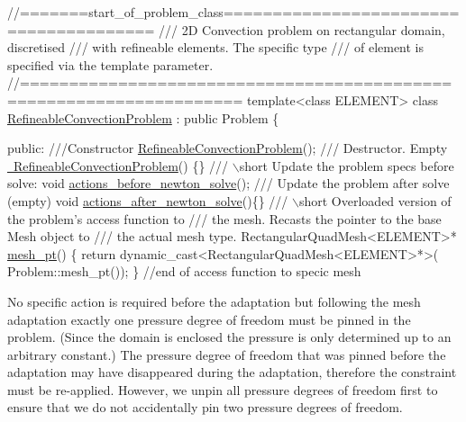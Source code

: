  
\begin{DoxyCodeInclude}
\textcolor{comment}{//=======start\_of\_problem\_class=======================================}
\textcolor{comment}{/// 2D Convection  problem on rectangular domain, discretised }
\textcolor{comment}{}\textcolor{comment}{/// with refineable elements. The specific type}
\textcolor{comment}{}\textcolor{comment}{/// of element is specified via the template parameter.}
\textcolor{comment}{}\textcolor{comment}{//====================================================================}
\textcolor{keyword}{template}<\textcolor{keyword}{class} ELEMENT> 
\textcolor{keyword}{class }\hyperlink{classRefineableConvectionProblem}{RefineableConvectionProblem} : \textcolor{keyword}{public} Problem
\{

\textcolor{keyword}{public}:
\textcolor{comment}{}
\textcolor{comment}{ ///Constructor}
\textcolor{comment}{} \hyperlink{classRefineableConvectionProblem_a97e661986093402bf55fb6c32b782ddc}{RefineableConvectionProblem}();
\textcolor{comment}{}
\textcolor{comment}{ /// Destructor. Empty}
\textcolor{comment}{} \hyperlink{classRefineableConvectionProblem_a43fc2693230601928578d5b0c6380943}{~RefineableConvectionProblem}() \{\}
\textcolor{comment}{}
\textcolor{comment}{ /// \(\backslash\)short Update the problem specs before solve:}
\textcolor{comment}{} \textcolor{keywordtype}{void} \hyperlink{classRefineableConvectionProblem_a694f0be87fe09a30d94e92acfce85eee}{actions\_before\_newton\_solve}();
\textcolor{comment}{}
\textcolor{comment}{ /// Update the problem after solve (empty)}
\textcolor{comment}{} \textcolor{keywordtype}{void} \hyperlink{classRefineableConvectionProblem_a13bda5e5e75928efa88433902ccab7ee}{actions\_after\_newton\_solve}()\{\}
\textcolor{comment}{}
\textcolor{comment}{ /// \(\backslash\)short Overloaded version of the problem's access function to }
\textcolor{comment}{ /// the mesh. Recasts the pointer to the base Mesh object to }
\textcolor{comment}{ /// the actual mesh type.}
\textcolor{comment}{} RectangularQuadMesh<ELEMENT>* \hyperlink{classRefineableConvectionProblem_a837d2412cee6996c78a2d2c5adf720f3}{mesh\_pt}() 
  \{
   \textcolor{keywordflow}{return} \textcolor{keyword}{dynamic\_cast<}RectangularQuadMesh<ELEMENT>*\textcolor{keyword}{>}(
    Problem::mesh\_pt());
  \} \textcolor{comment}{//end of access function to specic mesh}

\end{DoxyCodeInclude}


No specific action is required before the adaptation but following the mesh adaptation exactly one pressure degree of freedom must be pinned in the problem. (Since the domain is enclosed the pressure is only determined up to an arbitrary constant.) The pressure degree of freedom that was pinned before the adaptation may have disappeared during the adaptation, therefore the constraint must be re-\/applied. However, we unpin all pressure degrees of freedom first to ensure that we do not accidentally pin two pressure degrees of freedom.


